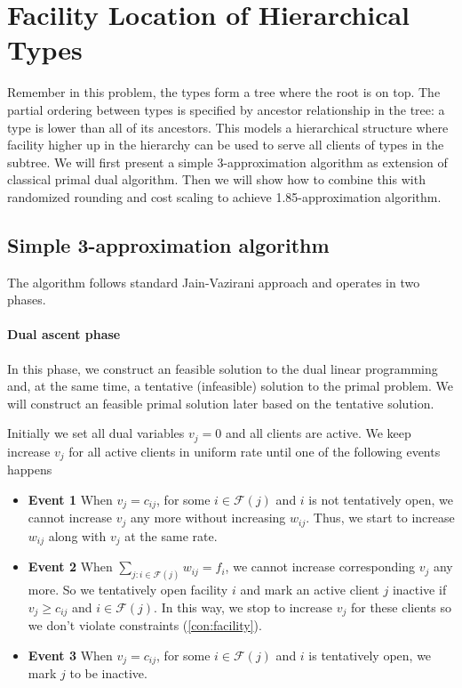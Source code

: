 \section{Facility Location of Hierarchical Types}

Remember in this problem, the types form a tree where the root is on top. The partial ordering between types is specified by ancestor relationship in the tree: a type is lower than all of its ancestors. This models a hierarchical structure where facility higher up in the hierarchy can be used to serve all clients of types in the subtree. We will first present a simple 3-approximation algorithm as extension of classical primal dual algorithm. Then we will show how to combine this with randomized rounding and cost scaling to achieve 1.85-approximation algorithm.

\subsection{Simple 3-approximation algorithm}

The algorithm follows standard Jain-Vazirani \cite{jain2001approximation} approach and operates in two phases.

\paragraph{Dual ascent phase}
In this phase, we construct an feasible solution to the dual linear programming and,
at the same time, a tentative (infeasible) solution to the primal problem.
We will construct an feasible primal solution later based on the tentative solution.

Initially we set all dual variables $v_j = 0$ and all clients are active.
We keep increase $v_j$ for all active clients in uniform rate until one of the following events happens

\begin{itemize}
\item \textbf{Event 1} When $v_j = c_{ij}$, for some $i \in \mathcal{F}(j)$ and $i$ is not tentatively open,
we cannot increase $v_j$ any more without increasing $w_{ij}$.
Thus, we start to increase $w_{ij}$ along with $v_j$ at the same rate.

\item \textbf{Event 2} When $\sum_{j: i \in \mathcal{F}(j)} w_{ij} = f_i$, we cannot increase corresponding $v_j$ any more.
So we tentatively open facility $i$ and mark an active client $j$ inactive if $v_j \ge c_{ij}$ and $i \in \mathcal{F}(j)$.
In this way, we stop to increase $v_j$ for these clients so we don't violate constraints (\ref{con:facility}).

\item \textbf{Event 3} When $v_j = c_{ij}$, for some $i \in \mathcal{F}(j)$ and $i$ is tentatively open,
we mark $j$ to be inactive.
\end{itemize}

